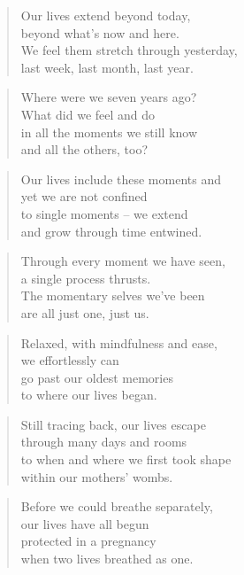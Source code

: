 \documentclass[10pt,a4paper]{article}
\begin{document}
\begin{multicols}{2}
\begin{verse}
Our lives extend beyond today,\\
beyond what’s now and here.\\
We feel them stretch through yesterday,\\
last week, last month, last year.
\end{verse}

\begin{verse}
Where were we seven years ago?\\
What did we feel and do\\
in all the moments we still know\\
and all the others, too?
\end{verse}

\begin{verse}
Our lives include these moments and\\
yet we are not confined\\
to single moments – we extend\\
and grow through time entwined.
\end{verse}

\begin{verse}
Through every moment we have seen,\\
a single process thrusts.\\
The momentary selves we’ve been\\
are all just one, just us.
\end{verse}

\begin{verse}
Relaxed, with mindfulness and ease,\\
we effortlessly can\\
go past our oldest memories\\
to where our lives began.
\end{verse}

\begin{verse}
Still tracing back, our lives escape\\
through many days and rooms\\
to when and where we first took shape\\
within our mothers’ wombs.
\end{verse}

\begin{verse}
Before we could breathe separately,\\
our lives have all begun\\
protected in a pregnancy\\
when two lives breathed as one.
\end{verse}


\end{multicols}
\end{document}
